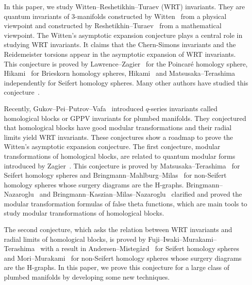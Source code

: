 \documentclass[11pt,a4paper,lualatex]{amsart}
\numberwithin{equation}{section} %
\begin{document}

In this paper, we study Witten--Reshetikhin--Turaev (WRT) invariants.
They are quantum invariants of $ 3 $-manifolds constructed by Witten~\cite{Witten} from a physical viewpoint and constructed by Reshetikhin--Turaev~\cite[Theorem 3.3.2]{Reshetikhin-Turaev} from a mathematical viewpoint.
The Witten's asymptotic expansion conjecture plays a central role in studying WRT invariants.
It claims that the Chern-Simons invariants and the Reidemeister torsions appear in the asymptotic expansion of WRT invariants.
This conjecture is proved by Lawrence--Zagier~\cite{LZ} for the Poincar\'{e} homology sphere, Hikami~\cite{H_Bries} for Brieskorn homology spheres, Hikami~\cite{H_Seifert} and Matsusaka--Terashima~\cite{Matsusaka-Terashima} independently for Seifert homology spheres.
Many other authors have studied this conjecture~\cite{Andersen-Himpel,Andersen-Mistegard,Andersen,Beasley-Witten,Charles,Chun,Charles-Marche_II,FIMT,Freed-Gompf,GMP,H_Lattice,H_Lattice2,Hansen-Takata,Jeffrey,Rozansky1,Rozansky2,Wu}.

Recently, Gukov--Pei--Putrov--Vafa~\cite{GPPV} introduced $ q $-series invariants called homological blocks or GPPV invariants for plumbed manifolds.
They conjectured that homological blocks have good modular transformations and their radial limits yield WRT invariants.
These conjectures show a roadmap to prove the Witten's asymptotic expansion conjecture.
The first conjecture, modular transformations of homological blocks, are related to quantum modular forms introduced by Zagier~\cite{Zagier_quantum}.
This conjecture is proved by Matsusaka--Terashima~\cite{Matsusaka-Terashima} for Seifert homology spheres and Bringmann--Mahlburg--Milas~\cite{BMM_high_depth} for non-Seifert homology spheres whose surgery diagrams are the H-graphs.
Bringmann--Nazaroglu~\cite{Bringmann-Nazaroglu} and Bringmann--Kaszian--Milas--Nazaroglu~\cite{BKMN_False_modular} clarified and proved the modular transformation formulas of false theta functions, which are main tools to study modular transformations of homological blocks.

The second conjecture, which asks the relation between WRT invariants and radial limits of homological blocks, is proved by Fuji--Iwaki--Murakami--Terashima~\cite{FIMT} with a result in Andersen--Misteg{\aa}rd~\cite{Andersen-Mistegard} for Seifert homology spheres and Mori--Murakami~\cite{MM} for non-Seifert homology spheres whose surgery diagrams are the H-graphs.
In this paper, we prove this conjecture for a large class of plumbed manifolds by developing some new techniques.
\end{document}
